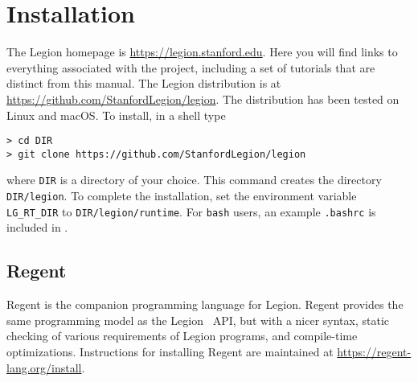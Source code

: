 \chapter{Installation}
\label{chap:start}

The Legion homepage is \url{https://legion.stanford.edu}.  Here you will find
links to everything associated with the project, including a set of
tutorials that are distinct from this manual.  The Legion distribution is at
\url{https://github.com/StanfordLegion/legion}.  The distribution has been
tested on Linux and macOS.  To install, in a shell type
\begin{lstlisting}
> cd DIR
> git clone https://github.com/StanfordLegion/legion
\end{lstlisting}
where {\tt DIR} is a directory of your choice.  This command creates 
the directory {\tt DIR/legion}.  To complete the installation,
set the environment variable {\tt LG\_RT\_DIR} to {\tt DIR/legion/runtime}.
For {\tt bash} users, an example {\tt .bashrc} is included in
.

\section{Regent}

Regent is the companion programming language for Legion.  Regent provides the same
programming model as the Legion \Cpp\ API, but with a nicer syntax, static checking
of various requirements of Legion programs, and compile-time optimizations.
Instructions for installing Regent are maintained at \url{https://regent-lang.org/install}.



